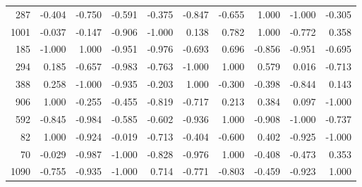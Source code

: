 \begin{longtable}{rrrrrrrrrr}
   287 & -0.404 & -0.750 & -0.591 & -0.375 & -0.847 & -0.655 &  1.000 & -1.000 & -0.305 \\
  1001 & -0.037 & -0.147 & -0.906 & -1.000 &  0.138 &  0.782 &  1.000 & -0.772 &  0.358 \\
   185 & -1.000 &  1.000 & -0.951 & -0.976 & -0.693 &  0.696 & -0.856 & -0.951 & -0.695 \\
   294 &  0.185 & -0.657 & -0.983 & -0.763 & -1.000 &  1.000 &  0.579 &  0.016 & -0.713 \\
   388 &  0.258 & -1.000 & -0.935 & -0.203 &  1.000 & -0.300 & -0.398 & -0.844 &  0.143 \\
   906 &  1.000 & -0.255 & -0.455 & -0.819 & -0.717 &  0.213 &  0.384 &  0.097 & -1.000 \\
   592 & -0.845 & -0.984 & -0.585 & -0.602 & -0.936 &  1.000 & -0.908 & -1.000 & -0.737 \\
    82 &  1.000 & -0.924 & -0.019 & -0.713 & -0.404 & -0.600 &  0.402 & -0.925 & -1.000 \\
    70 & -0.029 & -0.987 & -1.000 & -0.828 & -0.976 &  1.000 & -0.408 & -0.473 &  0.353 \\
  1090 & -0.755 & -0.935 & -1.000 &  0.714 & -0.771 & -0.803 & -0.459 & -0.923 &  1.000 \\
\end{longtable}
